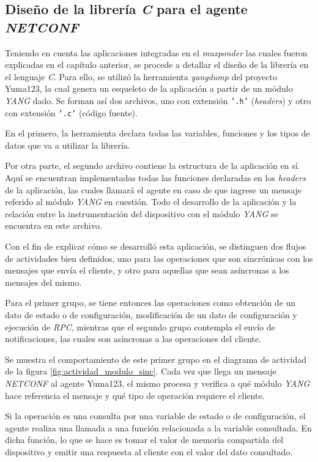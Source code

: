\subsection{Diseño de la librería \textit{C} para el agente \textit{NETCONF}}


  Teniendo en cuenta las aplicaciones integradas en el \textit{muxponder} las cuales fueron explicadas en el capítulo anterior, se procede a detallar el diseño de la librería en el lenguaje \textit{C}. Para ello, se utilizó la herramienta \textit{yangdump} del proyecto Yuma123, la cual genera un esqueleto de la aplicación a partir de un módulo \textit{YANG} dado. Se forman así dos archivos, uno con extensión \texttt{'.h'} (\textit{headers}) y otro con extensión \texttt{'.c'} (código fuente). 
  

  En el primero, la herramienta declara todas las variables, funciones y los tipos de datos que va a utilizar la librería. 

  Por otra parte, el segundo archivo contiene la estructura de la aplicación en sí. Aquí se encuentran implementadas todas las funciones declaradas en los \textit{headers} de la aplicación, las cuales llamará el agente en caso de que ingrese un mensaje referido al módulo \textit{YANG} en cuestión. Todo el desarrollo de la aplicación y la relación entre la instrumentación del dispositivo con el módulo \textit{YANG} se encuentra en este archivo. 


  Con el fin de explicar cómo se desarrolló esta aplicación, se distinguen dos flujos de actividades bien definidos, uno para las operaciones que son sincrónicas con los mensajes que envía el cliente, y otro para aquellas que sean asíncronas a los mensajes del mismo. 

  Para el primer grupo, se tiene entonces las operaciones como obtención de un dato de estado o de configuración, modificación de un dato de configuración y ejecución de \textit{RPC}, mientras que el segundo grupo contempla el envío de notificaciones, las cuales son asíncronas a las operaciones del cliente.
  

  Se muestra el comportamiento de este primer grupo en el diagrama de actividad de la figura \ref{fig:actividad_modulo_sinc}. Cada vez que llega un mensaje \textit{NETCONF} al agente Yuma123, el mismo procesa y verifica a qué módulo \textit{YANG} hace referencia el mensaje y qué tipo de operación requiere el cliente. 

  Si la operación es una consulta por una variable de estado o de configuración, el agente realiza una llamada a una función relacionada a la variable consultada. En dicha función, lo que se hace es tomar el valor de memoria compartida del dispositivo y emitir una respuesta al cliente con el valor del dato consultado.


